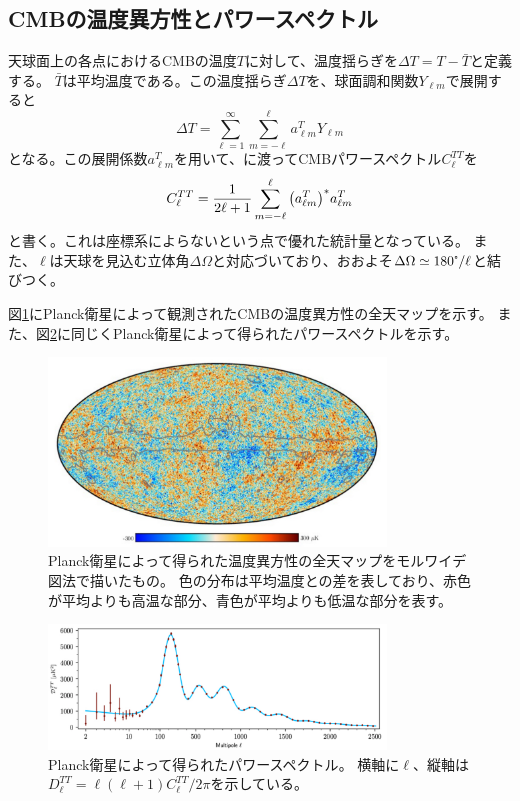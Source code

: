 \documentclass[../../main.tex]{subfiles}
\begin{document}
\subsection{CMBの温度異方性とパワースペクトル}
天球面上の各点におけるCMBの温度$T$に対して、温度揺らぎを$\Delta T = T-\bar{T}$と定義する。
$\bar{T}$は平均温度である。この温度揺らぎ$\Delta T$を、球面調和関数$Y_{\ell m}$で展開すると
\begin{equation}
    \Delta T = \sum_{\ell=1}^{\infty}\sum_{m=-\ell}^{\ell}a^{T}_{\ell m}Y_{\ell m}
\end{equation}
となる。この展開係数$a^{T}_{\ell m}$を用いて、に渡ってCMBパワースペクトル$C^{TT}_{\ell}$を
\begin{equation}
    C^{TT}_{\ell} = \dfrac{1}{2\ell+1}\sum_{m=-\ell}^{\ell}\qty(a^{T}_{\ell m})^{*}a^{T}_{\ell m}
\end{equation}
と書く。これは座標系によらないという点で優れた統計量となっている。
また、$\ell$は天球を見込む立体角$\Delta \Omega$と対応づいており、おおよそ$\Delta\Omega \simeq 180\tcdegree/\ell$と結びつく。

図\ref{fig:planck_cmb}にPlanck衛星によって観測されたCMBの温度異方性の全天マップを示す。
また、図\ref{fig:planck_powerspectrum}に同じくPlanck衛星によって得られたパワースペクトルを示す\cite{Planck_2020}。
\begin{figure}[H]
    \centering
    \includegraphics[width=0.8\textwidth]{intro/planck_cmb.pdf}
    \caption{Planck衛星によって得られた温度異方性の全天マップをモルワイデ図法で描いたもの\cite{Planck_2020}。
    色の分布は平均温度との差を表しており、赤色が平均よりも高温な部分、青色が平均よりも低温な部分を表す。}
    \label{fig:planck_cmb}
\end{figure}
\begin{figure}[H]
    \centering
    \includegraphics[width=0.8\textwidth]{intro/planck_powerspectrum.pdf}
    \caption{Planck衛星によって得られたパワースペクトル\cite{Planck_2020}。
    横軸に$\ell$、縦軸は\\$D^{TT}_{\ell}=\ell(\ell+1)C^{TT}_{\ell}/2\pi$を示している。}
    \label{fig:planck_powerspectrum}
\end{figure}
\end{document}
